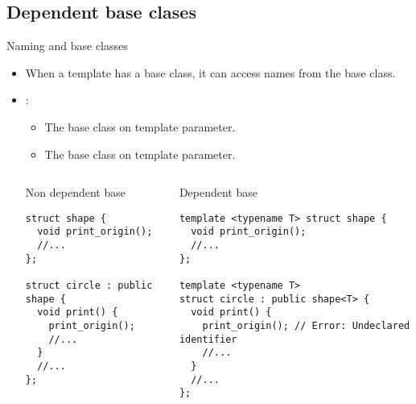 \subsection{Dependent base clases}

\begin{frame}[t,fragile]{Naming and base classes}
\begin{itemize}
  \item When a template has a base class, it can access names from the base class.

  \item {}:
    \begin{itemize}
      \item The base class  on template parameter.
      \item The base class  on template parameter.
    \end{itemize}

\pause
\begin{columns}[T]

\begin{block}{Non dependent base}
\begin{lstlisting}[basicstyle=\tiny]
struct shape {
  void print_origin();
  //...
};

struct circle : public shape {
  void print() {
    print_origin();
    //...
  }
  //...
};
\end{lstlisting}
\end{block}

\begin{block}{Dependent base}
\begin{lstlisting}[basicstyle=\tiny]
template <typename T> struct shape {
  void print_origin();
  //...
};

template <typename T> 
struct circle : public shape<T> {
  void print() {
    print_origin(); // Error: Undeclared identifier
    //...
  }
  //...
};
\end{lstlisting}
\end{block}

\end{columns}

\end{itemize}
\end{frame}

